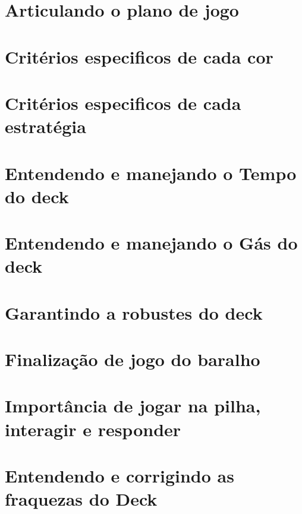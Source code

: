 \documentclass[12pt, a4paper]{article}
\begin{document}
    \section{Articulando o plano de jogo}
     \pagebreak

    \section{Critérios especificos de cada cor}
     \pagebreak

    \section{Critérios especificos de cada estratégia}
     \pagebreak

    \section{Entendendo e manejando o Tempo do deck}
     \pagebreak

    \section{Entendendo e manejando o Gás do deck}
     \pagebreak

    \section{Garantindo a robustes do deck}
     \pagebreak

    \section{Finalização de jogo do baralho}
     \pagebreak

    \section{Importância de jogar na pilha, interagir e responder}
     \pagebreak

    \section{Entendendo e corrigindo as fraquezas do Deck}
     \pagebreak
\end{document}
